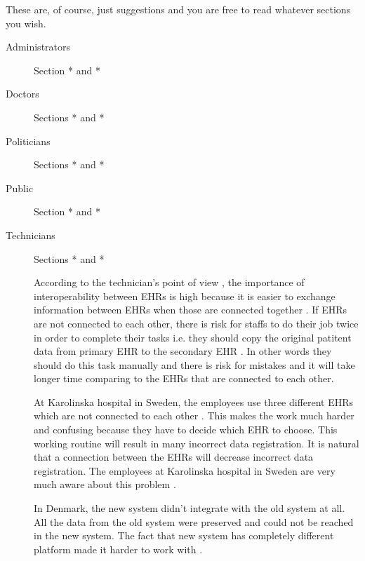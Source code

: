\documentclass[14pt]{article}
\begin{document}
These are, of course, just suggestions and you are free to read whatever sections you wish.

\begin{description}
\item[Administrators] Section * and *
\item[Doctors] Sections * and *
\item[Politicians] Sections * and *
\item[Public] Section * and *
\item[Technicians] Sections * and *

According to the technician's point of view \cite{FarzinYazdi}, the importance of interoperability between \glspl{EHR} is high because it is easier to exchange information between \glspl{EHR} when those are connected together \cite{FarzinYazdi}. If \glspl{EHR} are not connected to each other, there is risk for staffs to do their job twice in order to complete their tasks i.e. they should copy the original patitent data from primary \gls{EHR} to the secondary \gls{EHR} \cite{FarzinYazdi}. In other words they should do this task manually and there is risk for mistakes and it will take longer time comparing to the \glspl{EHR} that are connected to each other.

At Karolinska hospital in Sweden, the employees use three different \glspl{EHR} which are not connected to each other \cite{FarzinYazdi}. This makes the work much harder and confusing because they have to decide which \gls{EHR} to choose. This working routine will result in many incorrect data registration. It is natural that a connection between the \glspl{EHR} will decrease incorrect data registration. The employees at Karolinska hospital in Sweden are very much aware about this problem \cite{FarzinYazdi}.

In Denmark, the new system didn't integrate with the old system at all. All the data from the old system were preserved and could not be reached in the new system. The fact that new system has completely different platform made it harder to work with \cite{FarzinYazdi}.


\end{description}
\end{document}
